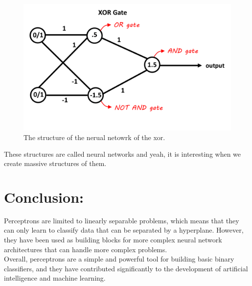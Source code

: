 \documentclass[12pt]{article}
\begin{document}
\begin{figure}[H]
  \centering
  \includegraphics[scale = 0.5]{neurons.png}
  \caption{The structure of the nerual netowrk of the xor.}
\end{figure}
These structures are called neural networks and yeah, it is interesting when we create massive
structures of them.
\section{Conclusion:}
Perceptrons are limited to linearly separable problems, which means that they can only learn to
classify data that can be separated by a hyperplane. However, they have been used as building blocks
for more
complex neural network architectures that can handle more complex problems.\\
Overall, perceptrons are a simple and powerful tool for building basic binary classifiers, and
they have contributed significantly to the development of artificial intelligence and machine learning.
\end{document}
